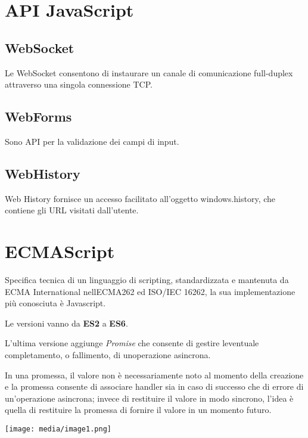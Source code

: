 \section{API JavaScript}\label{api-javascript}

\subsection{WebSocket}\label{websocket}

Le WebSocket consentono di instaurare un canale di comunicazione
full-duplex attraverso una singola connessione TCP.

\subsection{WebForms}\label{webforms}

Sono API per la validazione dei campi di input.

\subsection{WebHistory}\label{webhistory}

Web History fornisce un accesso facilitato all'oggetto windows.history,
che contiene gli URL visitati dall'utente.

\section{ECMAScript}\label{ecmascript}

Specifica tecnica di un linguaggio di scripting, standardizzata e
mantenuta da ECMA International nell\textquotesingle ECMA262 ed ISO/IEC
16262, la sua implementazione più conosciuta è Javascript.

Le versioni vanno da \textbf{ES2} a \textbf{ES6}.

L'ultima versione aggiunge \emph{Promise} che consente di gestire
l\textquotesingle eventuale completamento, o fallimento, di
un\textquotesingle operazione asincrona.

In una promessa, il valore non è necessariamente noto al momento della
creazione e la promessa consente di associare handler sia in caso di
successo che di errore di un'operazione asincrona; invece di restituire
il valore in modo sincrono, l'idea è quella di restituire la promessa di
fornire il valore in un momento futuro.

\texttt{[image: media/image1.png]}

